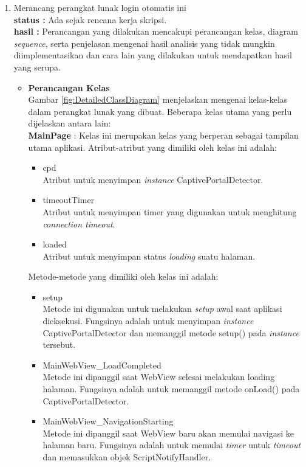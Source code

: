 \documentclass[a4paper,twoside]{article}
\begin{document}
\begin{enumerate}
		\item Merancang perangkat lunak login otomatis ini\\
		{\bf status :} Ada sejak rencana kerja skripsi.\\
		{\bf hasil :} Perancangan yang dilakukan mencakupi perancangan kelas, diagram \textit{sequence}, serta penjelasan mengenai hasil analisis yang tidak mungkin diimplementasikan dan cara lain yang dilakukan untuk mendapatkan hasil yang serupa.
        \begin{itemize}
            \item{
                {\bf Perancangan Kelas}\\
                Gambar \ref{fig:DetailedClassDiagram} menjelaskan mengenai kelas-kelas dalam perangkat lunak yang dibuat. Beberapa kelas utama yang perlu dijelaskan antara lain:\\
                \textbf{MainPage} : Kelas ini merupakan kelas yang berperan sebagai tampilan utama aplikasi. Atribut-atribut yang dimiliki oleh kelas ini adalah:
                \begin{itemize}
                    \item{cpd\\Atribut untuk menyimpan \textit{instance} CaptivePortalDetector.}
                    \item{timeoutTimer\\Atribut untuk menyimpan timer yang digunakan untuk menghitung \textit{connection timeout}.}
                    \item{loaded\\Atribut untuk menyimpan status \textit{loading} suatu halaman.}
                \end{itemize}
                Metode-metode yang dimiliki oleh kelas ini adalah:
                \begin{itemize}
                    \item{setup\\Metode ini digunakan untuk melakukan \textit{setup} awal saat aplikasi dieksekusi. Fungsinya adalah untuk menyimpan \textit{instance} CaptivePortalDetector dan memanggil metode setup() pada \textit{instance} tersebut.}
                    \item{MainWebView\_LoadCompleted\\Metode ini dipanggil saat WebView selesai melakukan loading halaman. Fungsinya adalah untuk memanggil metode onLoad() pada CaptivePortalDetector.}
                    \item{MainWebView\_NavigationStarting\\Metode ini dipanggil saat WebView baru akan memulai navigasi ke halaman baru. Fungsinya adalah untuk memulai \textit{timer} untuk \textit{timeout} dan memasukkan objek ScriptNotifyHandler.}

\end{itemize}}
\end{itemize}
\end{enumerate}
\end{document}

